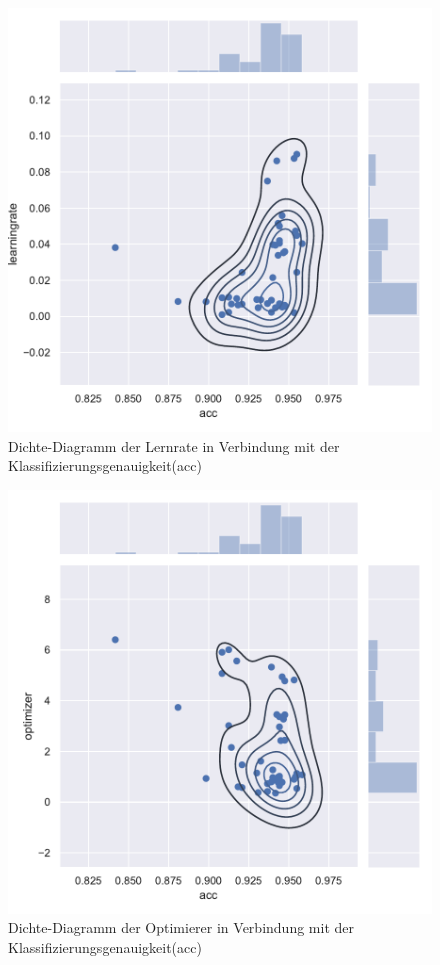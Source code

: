 \begin{figure}[H]
  \centering  
  \includegraphics[scale=0.5]{anhang/GA_250_mnist_digits_True_big_jointplot_learningrate.pdf}
  \caption{Dichte-Diagramm der Lernrate in Verbindung mit der Klassifizierungsgenauigkeit(acc)}
  
\end{figure}

\begin{figure}[H]
  \centering  
  \includegraphics[scale=0.5]{anhang/GA_250_mnist_digits_True_big_jointplot_optimizer.pdf}
  \caption{Dichte-Diagramm der Optimierer in Verbindung mit der Klassifizierungsgenauigkeit(acc)}
  
\end{figure}

